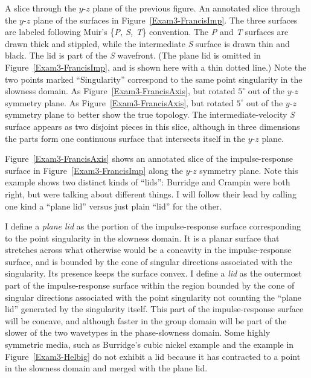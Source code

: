{A slice through the $y$-$z$ plane of the previous figure.}
{
An annotated slice through the $y$-$z$ plane of the surfaces
in Figure~\protect\ref{Exam3-FrancisImp}.
The three surfaces are labeled following Muir's \{{\sl P, S, T}\} convention.
The {\sl P} and {\sl T} surfaces are drawn thick and stippled,
while the intermediate {\sl S} surface is drawn thin and black.
The lid is part of the {\sl S} wavefront.
(The plane lid is omitted in Figure~\protect\ref{Exam3-FrancisImp},
and is shown here with a thin dotted line.)
Note the two points marked ``Singularity'' correspond to the same point
singularity in the slowness domain.
}
{As Figure~\protect\ref{Exam3-FrancisAxis}, but rotated $5^\circ$ out
of the $y$-$z$ symmetry plane.}
{
As Figure~\protect\ref{Exam3-FrancisAxis}, but rotated $5^\circ$ out
of the $y$-$z$ symmetry plane to better show the true topology.
The intermediate-velocity {\sl S} surface appears as two disjoint
pieces in this slice, although in three dimensions the parts form
one continuous surface that intersects itself in the $y$-$z$ plane.
}

Figure~\ref{Exam3-FrancisAxis} shows an annotated slice of the impulse-response
surface in Figure~\ref{Exam3-FrancisImp} along the $y$-$z$ symmetry plane.
Note this example shows two distinct kinds of ``lids'':
Burridge and Crampin were both right, but were talking about different
things. I will follow their lead by calling one kind a ``plane lid''
versus just plain ``lid'' for the other.

I define a {\em plane lid\/} as the portion of the impulse-response
surface corresponding to the point singularity in the slowness domain.
It is a planar surface that stretches across what otherwise would be a
concavity in the impulse-response surface, and is bounded by the cone
of singular directions associated with the singularity.
Its presence keeps the surface convex.
I define a {\em lid\/} as the outermost part of the impulse-response
surface within the region bounded by the cone of singular directions
associated with the point singularity not counting the ``plane lid''
generated by the singularity itself.
This part of the impulse-response surface will be concave,
and although faster in the group domain
will be part of the slower of the two wavetypes
in the phase-slowness domain.
Some highly symmetric media, such as Burridge's cubic nickel example
and the example in Figure~\ref{Exam3-Helbig} do not exhibit a lid
because it has contracted to a point in the slowness domain and merged
with the plane lid.

